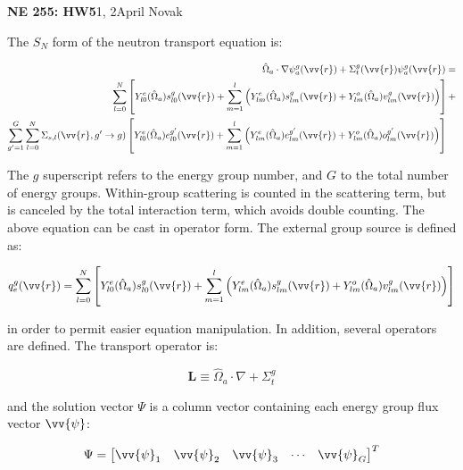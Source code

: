 \documentclass[10pt]{article}
\newcommand*\circled[1]{\tikz[baseline=(char.base)]{
            \node[shape=circle,draw,inner sep=2pt] (char) {#1};}}
\begin{document}
\textbf{NE 255: HW5}1, 2\hfill April Novak\newline

\circled{1} The \(S_N\) form of the neutron transport equation is:

\begin{equation}
\label{eq:StartofOperatorForm}
\begin{aligned}
 \hat{\Omega}_a\cdot\nabla\psi_a^g(\vv{r}) + 
 \Sigma_t^g(\vv{r})\psi_a^g(\vv{r}) = \\
\sum_{l=0}^{N}\left\lbrack Y_{l0}^e(\hat{\Omega}_a)s_{l0}^g(\vv{r})+\sum_{m=1}^{l}\left(Y_{lm}^e(\hat{\Omega}_a)s_{lm}^g(\vv{r})+Y_{lm}^o(\hat{\Omega}_a)v_{lm}^g(\vv{r})\right)\right\rbrack+\\
\sum_{g'=1}^G\sum_{l=0}^{N}\Sigma_{s,l}(\vv{r}, g'\rightarrow g)\left\lbrack Y_{l0}^e(\hat{\Omega}_a)e_{l0}^{g'}(\vv{r})+\sum_{m=1}^{l}\left(Y_{lm}^e(\hat{\Omega}_a)e_{lm}^{g'}(\vv{r})+Y_{lm}^o(\hat{\Omega}_a)o_{lm}^{g'}(\vv{r})\right)\right\rbrack\quad\\
\end{aligned}
\end{equation}

The \(g\) superscript refers to the energy group number, and \(G\) to the total number of energy groups. Within-group scattering is counted in the scattering term, but is canceled by the total interaction term, which avoids double counting. The above equation can be cast in operator form. The external group source is defined as:

\begin{equation}
q_e^g(\vv{r})=\sum_{l=0}^{N}\left\lbrack Y_{l0}^e(\hat{\Omega}_a)s_{l0}^g(\vv{r})+\sum_{m=1}^{l}\left(Y_{lm}^e(\hat{\Omega}_a)s_{lm}^g(\vv{r})+Y_{lm}^o(\hat{\Omega}_a)v_{lm}^g(\vv{r})\right)\right\rbrack
\end{equation}

in order to permit easier equation manipulation. In addition, several operators are defined. The transport operator is:

\begin{equation}
\textbf{L}\equiv\hat{\Omega}_a\cdot\nabla+\Sigma_t^g
\end{equation}

and the solution vector \(\Psi\) is a column vector containing each energy group flux vector \(\vv{\psi}\):

\begin{equation}
\Psi=\begin{bmatrix}\vv{\psi}_1&\vv{\psi}_2&\vv{\psi}_3&\cdots&\vv{\psi}_G\end{bmatrix}^T
\end{equation}
\end{document}
